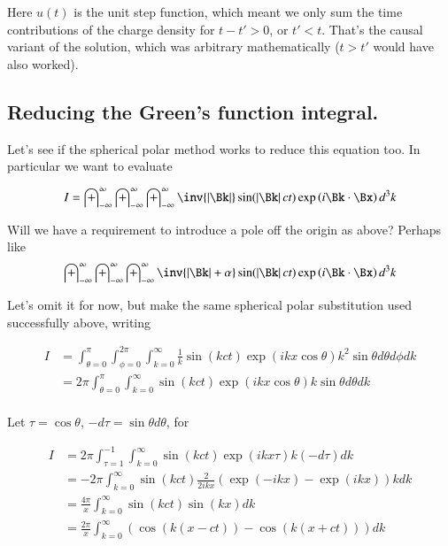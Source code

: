 \documentclass{article}
\newcommand{\IIinf}[0]{ \int_{-\infty}^\infty }
\begin{document}
Here $u(t)$ is the unit step function, which meant we only sum the time contributions of the charge density for $t - t' > 0$, or $t' < t$.  That's the causal variant of the solution, which was arbitrary mathematically ($t > t'$ would have also worked).

\subsection{ Reducing the Green's function integral. }

Let's see if the spherical polar method works to reduce this equation too.  In particular we want to evaluate

\begin{align*}
I = \IIinf \IIinf \IIinf \inv{\Abs{\Bk}} \sin( \Abs{\Bk} c t ) \exp\left( i \Bk \cdot \Bx \right) d^3 k
\end{align*}

Will we have a requirement to introduce a pole off the origin as above?  Perhaps like
\begin{align*}
\IIinf \IIinf \IIinf \inv{\Abs{\Bk} + \alpha} \sin( \Abs{\Bk} c t ) \exp\left( i \Bk \cdot \Bx \right) d^3 k
\end{align*}

Let's omit it for now, but make the same spherical polar substitution used successfully above, writing

\begin{align*}
I 
&= \int_{\theta=0}^{\pi} \int_{\phi=0}^{2\pi} \int_{k=0}^\infty \frac{1}{k } 
\sin\left( k c t \right) \exp\left( i k x \cos\theta \right) 
k^2 \sin\theta d\theta d\phi dk \\
&= 2 \pi \int_{\theta=0}^{\pi} \int_{k=0}^\infty %
\sin\left( k c t \right) \exp\left( i k x \cos\theta \right) 
k \sin\theta d\theta dk \\
\end{align*}

Let $\tau = \cos\theta$, $-d\tau = \sin\theta d\theta$, for

\begin{align*}
I 
&= 2 \pi \int_{\tau=1}^{-1} \int_{k=0}^\infty %
\sin\left( k c t \right) \exp\left( i k x \tau \right) 
k (-d\tau) dk \\
&= -2 \pi \int_{k=0}^\infty %
\sin\left( k c t \right) 
\frac{2}{2i k x} \left( {\exp\left( -i k x \right) } -{\exp\left( i k x \right) } \right)
k dk \\
&= \frac{4 \pi }{x} \int_{k=0}^\infty %
\sin\left( k c t \right) 
\sin\left( k x \right) 
dk \\
&= \frac{2 \pi }{x} \int_{k=0}^\infty %
\left( \cos\left( k (x-c t) \right) -\cos\left( k (x+c t) \right) \right)
 dk \\
\end{align*}
\end{document}
